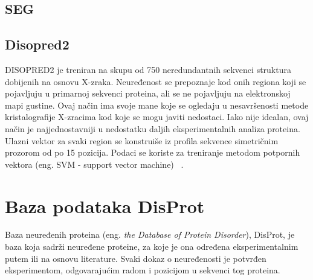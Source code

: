 \subsection{SEG}



\subsection{Disopred2}

DISOPRED2 je treniran na skupu od 750 neredundantnih sekvenci struktura dobijenih na osnovu X-zraka.  Neuređenost se prepoznaje kod onih regiona koji se pojavljuju u primarnoj sekvenci proteina, ali se ne pojavljuju na elektronskoj mapi gustine. Ovaj način ima svoje mane koje se ogledaju u nesavršenosti metode kristalografije X-zracima kod koje se mogu javiti nedostaci. Iako nije idealan, ovaj način je najjednostavniji u nedostatku daljih eksperimentalnih analiza proteina. Ulazni vektor za svaki region se konstruiše iz profila sekvence simetričnim prozorom od po 15 pozicija. Podaci se koriste za treniranje  metodom potpornih vektora (eng. SVM - support vector machine) ~\cite{DISOPRED}.


\section{Baza podataka DisProt}

Baza neuređenih proteina (eng. \emph{the Database of Protein Disorder}), DisProt, je baza koja sadrži neuređene proteine, za koje je ona određena  eksperimentalnim putem ili na osnovu literature. Svaki dokaz o neuređenosti je potvrđen eksperimentom, odgovarajućim radom i pozicijom u sekvenci tog proteina. 



